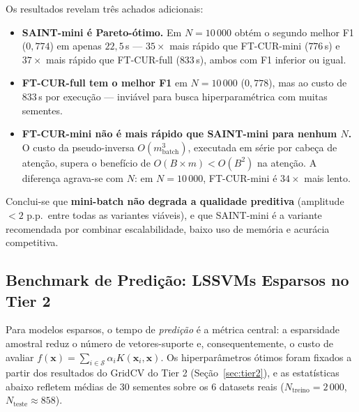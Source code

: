 \documentclass[12pt,a4paper]{article}
\begin{document}
Os resultados revelam três achados adicionais:

\begin{itemize}
  \item \textbf{SAINT-mini é Pareto-ótimo.} Em $N{=}10\,000$ obtém o segundo
        melhor F1 ($0{,}774$) em apenas $22{,}5$\,s — $35{\times}$ mais rápido
        que FT-CUR-mini ($776$\,s) e $37{\times}$ mais rápido que FT-CUR-full
        ($833$\,s), ambos com F1 inferior ou igual.

  \item \textbf{FT-CUR-full tem o melhor F1} em $N{=}10\,000$ ($0{,}778$),
        mas ao custo de $833$\,s por execução — inviável para busca
        hiperparamétrica com muitas sementes.

  \item \textbf{FT-CUR-mini não é mais rápido que SAINT-mini para nenhum $N$.}
        O custo da pseudo-inversa $O(m_{\text{batch}}^3)$, executada em série
        por cabeça de atenção, supera o benefício de $O(B{\times}m) <
        O(B^2)$ na atenção. A diferença agrava-se com $N$: em $N{=}10\,000$,
        FT-CUR-mini é $34{\times}$ mais lento.
\end{itemize}

Conclui-se que \textbf{mini-batch não degrada a qualidade preditiva} (amplitude
$< 2$ p.p.\ entre todas as variantes viáveis), e que SAINT-mini é a variante
recomendada por combinar escalabilidade, baixo uso de memória e acurácia
competitiva.

\subsection{Benchmark de Predição: LSSVMs Esparsos no Tier 2}
\label{sec:lssvm_pred_benchmark}

Para modelos esparsos, o tempo de \emph{predição} é a métrica central: a
esparsidade amostral reduz o número de vetores-suporte e, consequentemente, o
custo de avaliar $f(\mathbf{x}) = \sum_{i \in \mathcal{S}} \alpha_i
K(\mathbf{x}_i, \mathbf{x})$. Os hiperparâmetros ótimos foram fixados a partir
dos resultados do GridCV do Tier 2 (Seção~\ref{sec:tier2}), e as estatísticas
abaixo refletem médias de 30 sementes sobre os 6 datasets reais
($N_{\text{treino}}{=}2\,000$, $N_{\text{teste}}{\approx}858$).
\end{document}
